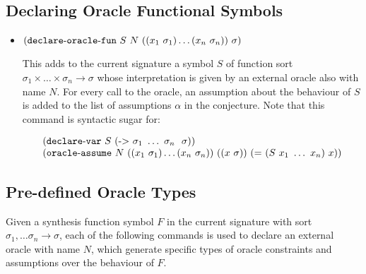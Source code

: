 \documentclass[english,a4paper,10pt]{article}
\begin{document}
\subsection{Declaring Oracle Functional Symbols}

\begin{itemize}
\item ${\tt (}{\tt declare\mbox{-}oracle\mbox{-}fun}\mbox{ }S\mbox{ } N\mbox{ }{\tt (}{\tt (}x_1\mbox{ }\sigma_1{\tt )} \ldots {\tt (}x_n\mbox{ }\sigma_n{\tt )}{\tt )}\mbox{ }\sigma{\tt )}$

This adds to the current signature a symbol $S$ of function sort 
$\sigma_1 \times \ldots \times \sigma_n \rightarrow \sigma$
whose interpretation is given by an external oracle also with name $N$. 
For every call to the oracle, an assumption about the behaviour of $S$ is added to the list of assumptions $\alpha$ in the conjecture.
Note that this command is syntactic sugar for:

\[
\begin{array}{l}
{\tt (}{\tt declare\mbox{-}var}\mbox{ }S \mbox{ }{\tt (}{\tt \mbox{->}}\mbox{ }  \sigma_1\mbox{ } \ldots\mbox{ } \sigma_n\mbox{ } \mbox{ }\sigma{\tt )}{\tt )}\\
{\tt (}{\tt oracle\mbox{-}assume}\mbox{ } N \mbox{ } 
{\tt (}{\tt (}x_1\mbox{ }\sigma_1{\tt )} \ldots {\tt (}x_n\mbox{ }\sigma_n{\tt )}{\tt )}\mbox{ }
{\tt (}{\tt (}x \mbox{ }\sigma{\tt )}{\tt )}  \mbox{ } 
{\tt (}{\tt=}\mbox{ } {\tt (}S \mbox{ } x_1 \mbox{ } \ldots \mbox{ } x_n{\tt )}\mbox{ } x{\tt )}
{\tt )}
\end{array}
\]
\end{itemize}


\subsection{Pre-defined Oracle Types}
Given a synthesis function symbol $F$ in the current signature
with sort $\sigma_1, \ldots \sigma_n \rightarrow \sigma$, each of the following commands 
is used to declare an external oracle with name $N$, which generate specific types of oracle constraints and assumptions over the behaviour of $F$. 
\end{document}
